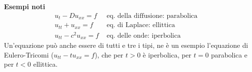 {\bf Esempi noti}
\[
\begin{array}{ll}
	u_t - Du_{xx}=f &\mbox{ eq. della diffusione: parabolica }\\
	u_{tt} + u_{xx}=f &\mbox{ eq. di Laplace: ellittica }\\
	u_{tt} - c^2 u_{xx}=f &\mbox{ eq. delle onde: iperbolica }
\end{array}
\]
Un'equazione pu\`o anche essere di tutti e tre i tipi, ne \`e un esempio l'equazione di Eulero-Tricomi ($u_{tt}-tu_{xx}=f$), che per $t>0$ \`e iperbolica,
per $t=0$ parabolica e per $t<0$ ellittica. 